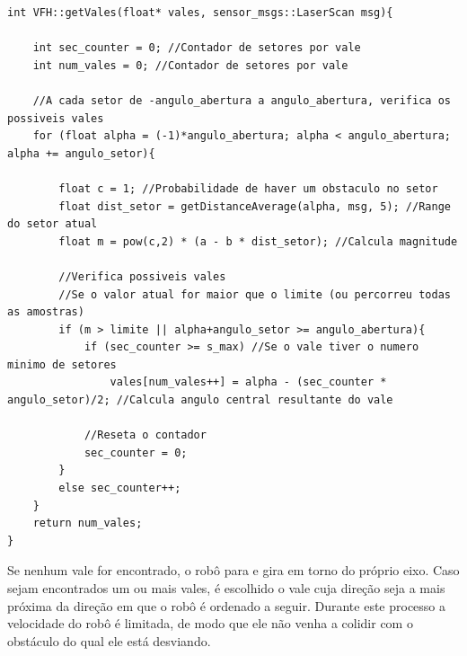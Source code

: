 \begin{lstlisting}[frame=single, label=cod:vales, style=customc, caption={Algoritmo de Verificação de Vales}]
int VFH::getVales(float* vales, sensor_msgs::LaserScan msg){
    
    int sec_counter = 0; //Contador de setores por vale
    int num_vales = 0; //Contador de setores por vale
    
    //A cada setor de -angulo_abertura a angulo_abertura, verifica os possiveis vales
    for (float alpha = (-1)*angulo_abertura; alpha < angulo_abertura; alpha += angulo_setor){
        
        float c = 1; //Probabilidade de haver um obstaculo no setor
        float dist_setor = getDistanceAverage(alpha, msg, 5); //Range do setor atual
        float m = pow(c,2) * (a - b * dist_setor); //Calcula magnitude
        
        //Verifica possiveis vales
        //Se o valor atual for maior que o limite (ou percorreu todas as amostras)
        if (m > limite || alpha+angulo_setor >= angulo_abertura){
            if (sec_counter >= s_max) //Se o vale tiver o numero minimo de setores
                vales[num_vales++] = alpha - (sec_counter * angulo_setor)/2; //Calcula angulo central resultante do vale
            
            //Reseta o contador
            sec_counter = 0;
        }
        else sec_counter++;
    }
    return num_vales;
}
\end{lstlisting}


Se nenhum vale for encontrado, o robô para e gira em torno do próprio
eixo. Caso sejam encontrados um ou mais vales, é escolhido o vale cuja
direção seja a mais próxima da direção em que o robô é ordenado a
seguir. Durante este processo a velocidade do robô é limitada, de modo
que ele não venha a colidir com o obstáculo do qual ele está
desviando.

